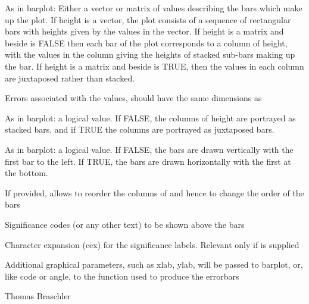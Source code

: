 \documentclass[a4paper]{book}
\begin{document}
\begin{Arguments}
\begin{ldescription}
\item[\code{height}] 
As in barplot: Either a vector or matrix of values describing the bars which make up the plot. If height is a vector, the plot consists of a sequence of rectangular bars with heights given by the values in the vector. If height is a matrix and beside is FALSE then each bar of the plot corresponds to a column of height, with the values in the column giving the heights of stacked sub-bars making up the bar. If height is a matrix and beside is TRUE, then the values in each column are juxtaposed rather than stacked.

\item[\code{sd\_height}] 
Errors associated with the values, should have the same dimensions as 

\item[\code{beside}] 
As in barplot: a logical value. If FALSE, the columns of height are portrayed as stacked bars, and if TRUE the columns are portrayed as juxtaposed bars.


\item[\code{horiz}] 
As in barplot: a logical value. If FALSE, the bars are drawn vertically with the first bar to the left. If TRUE, the bars are drawn horizontally with the first at the bottom.

\item[\code{group\_order}] 
If provided, allows to reorder the columns of  and hence to change the order of the bars
\item[\code{sig\_codes}] 
Significance codes (or any other text) to be shown above the bars

\item[\code{sig.cex}] Character expansion (cex) for the significance labels. Relevant only if  is supplied


\item[\code{...}] 
Additional graphical parameters, such as xlab, ylab, will be passed to barplot, or, like code or angle, to the  function used to produce the errorbars

\end{ldescription}
\end{Arguments}
%
\begin{Author}\relax
Thomas Braschler
\end{Author}
\end{document}
